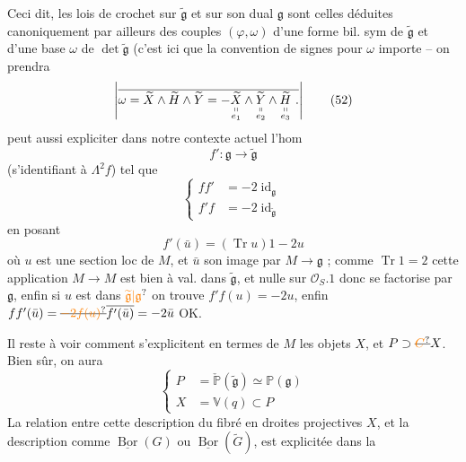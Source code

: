 Ceci dit, les lois de crochet sur $\widetilde{\mathfrak g}$ et sur son dual $\mathfrak g$ sont celles déduites canoniquement par ailleurs des couples $(\varphi,\omega)$ d'une forme bil. sym de $\widetilde{\mathfrak g}$ et d'une base $\omega$ de $\det\widetilde{\mathfrak g}$ (c'est ici que la convention de signes pour $\omega$ importe -- on prendra
\[
\left|\overline{\omega=\widetilde X\wedge\widetilde H\wedge\widetilde Y
=-\underset{\substack{\shortparallel\\e_1}}{\widetilde X}\wedge\underset{\substack{\shortparallel\\e_2}}{\widetilde Y}\wedge\underset{\substack{\shortparallel\\e_3}}{\widetilde H}\ .}\right|\tag*{(52)}
\]
 peut aussi expliciter dans notre contexte actuel l'hom
\[
f':\mathfrak g\longrightarrow\widetilde{\mathfrak g}\tag*{(53)}
\]
(s'identifiant à $\Lambda^2f$) tel que
\[
\left\{\begin{aligned}
ff'&=-2\operatorname{id}_{\mathfrak g}\\
f'f&=-2\operatorname{id}_{\widetilde{\mathfrak g}}
\end{aligned}\right.\tag*{(54)}
\]
en posant
\[
f'(\bar u)=(\operatorname{Tr}u)1-2u\tag*{(55)}
\]
où $u$ est une section loc de $M$, et $\bar u$ son image par $M\to\mathfrak g$ ; comme $\operatorname{Tr}1=2$ cette application  $M\to M$ est bien à val. dans $\widetilde{\mathfrak g}$, et nulle sur $\mathcal O_S.1$ donc se factorise par $\mathfrak g$, enfin si $u$ est dans $\unsure{\widetilde{\mathfrak g}|\mathfrak g}$ on trouve $f'f(u)=-2u$, enfin $ff'(\bar u)=\deleted{\unsure{-2f(u)}}\overline{f'(\bar u)}=-2\bar u$ OK.

Il reste à voir comment s'explicitent en termes de $M$ les objets $X$, et $P\supset\deleted{\unsure{C}}X$. Bien sûr, on aura
\[
\left\{\begin{aligned}
P&=\check{\mathbb P}(\widetilde{\mathfrak g})\simeq\mathbb P(\mathfrak g)\\
X&=\mathbb V(q)\subset P
\end{aligned}\right.\tag*{(56)}
\]
La relation  entre cette description du fibré en droites projectives $X$, et la description comme $\underline{\operatorname{Bor}}(G)$ ou $\underline{\operatorname{Bor}}(\widetilde G)$, est explicitée dans la

